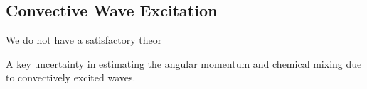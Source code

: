 {\color{purple}
\subsection{Convective Wave Excitation}
}

We do not have a satisfactory theor

A key uncertainty in estimating the angular momentum and chemical mixing due to convectively excited waves.
